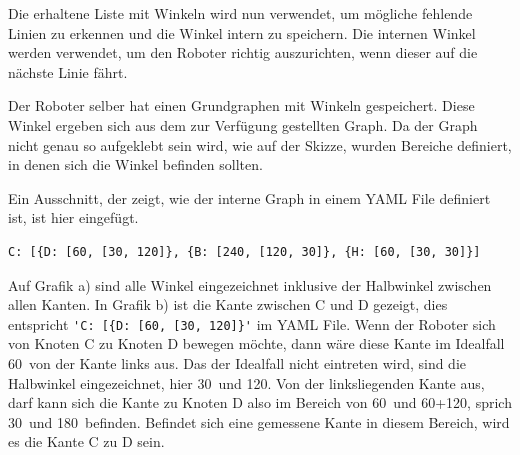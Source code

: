 Die erhaltene Liste mit Winkeln wird nun verwendet, um mögliche fehlende Linien zu erkennen und die Winkel intern zu speichern. Die internen Winkel werden verwendet, um den Roboter richtig auszurichten, wenn dieser auf die nächste Linie fährt.

Der Roboter selber hat einen Grundgraphen mit Winkeln gespeichert. Diese Winkel ergeben sich aus dem zur Verfügung gestellten Graph.
Da der Graph nicht genau so aufgeklebt sein wird, wie auf der Skizze, wurden Bereiche definiert, in denen sich die Winkel befinden sollten.

Ein Ausschnitt, der zeigt, wie der interne Graph in einem YAML File definiert ist, ist hier eingefügt.

\begin{verbatim}
C: [{D: [60, [30, 120]}, {B: [240, [120, 30]}, {H: [60, [30, 30]}]
\end{verbatim}

Auf Grafik a) sind alle Winkel eingezeichnet inklusive der Halbwinkel zwischen allen Kanten. In Grafik b) ist die Kante zwischen C und D gezeigt, dies entspricht \verb|'C: [{D: [60, [30, 120]}'| im YAML File. Wenn der Roboter sich von Knoten C zu Knoten D bewegen möchte, dann wäre diese Kante im Idealfall 60\textdegree\ von der Kante links aus. Das der Idealfall nicht eintreten wird, sind die Halbwinkel eingezeichnet, hier 30\textdegree\ und 120\textdegree. Von der linksliegenden Kante aus, darf kann sich die Kante zu Knoten D also im Bereich von 60\textdegree\ und 60\textdegree+120\textdegree, sprich 30\textdegree\ und 180\textdegree\ befinden. Befindet sich eine gemessene Kante in diesem Bereich, wird es die Kante C zu D sein.

